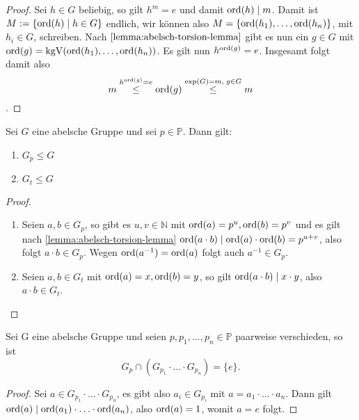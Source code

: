\begin{proof}
    Sei $h \in G$ beliebig, so gilt $h^m = e$ und damit $\operatorname{ord}(h) \mid m$. Damit ist $M := \{ \operatorname{ord}(h) \mid h \in G \}$ endlich, wir können also $M = \{ \operatorname{ord}(h_1), \hdots, \operatorname{ord}(h_n) \}$, mit $h_i \in G$, schreiben. Nach $\cref{lemma:abelsch-torsion-lemma}$ gibt es nun ein $g \in G$ mit $\operatorname{ord}(g) = \mathrm{kgV}(\operatorname{ord}(h_1), \hdots, \operatorname{ord}(h_n))$. Es gilt nun $h^{\operatorname{ord}(g)} = e$. Insgesamt folgt damit also $$m \overset{h^{\operatorname{ord}(g)} = e}{\leq} \operatorname{ord}(g) \overset{\exp(G) = m,\; g \in G}{\leq} m$$.
\end{proof}

\begin{lemma}
    Sei $G$ eine abelsche Gruppe und sei $p \in \mathbb{P}$. Dann gilt:
    \begin{enumerate}
        \item $G_p \leq G$
        \item $G_t \leq G$
    \end{enumerate}
\end{lemma}

\begin{proof}{\ }
    \begin{enumerate}
        \item Seien $a, b \in G_p$, so gibt es $u, v \in \mathbb{N}$ mit $\operatorname{ord}(a) = p^u, \operatorname{ord}(b) = p^v$ und es gilt nach \cref{lemma:abelsch-torsion-lemma} $\operatorname{ord}(a \cdot b) \mid \operatorname{ord}(a) \cdot \operatorname{ord}(b) = p^{u+v}$, also folgt $a \cdot b \in G_p$. Wegen $\operatorname{ord}(a^{-1}) = \operatorname{ord}(a)$ folgt auch $a^{-1} \in G_p$.
        \item Seien $a, b \in G_t$ mit $\operatorname{ord}(a) = x, \operatorname{ord}(b) = y$, so gilt $ \operatorname{ord}(a \cdot b) \mid x \cdot y$, also $a \cdot b \in G_t$.
    \end{enumerate}
\end{proof}

\begin{lemma} \label{lemma:p-anteile-verschieden}
    Sei G eine abelsche Gruppe und seien $p, p_1, \hdots, p_n \in \mathbb{P}$ paarweise verschieden, so ist
    $$ G_p \cap ( G_{p_1} \cdot \hdots \cdot G_{p_n} ) = \{ e \}. $$
\end{lemma}

\begin{proof}
    Sei $a \in G_{p_1} \cdot \hdots \cdot G_{p_n}$, es gibt also $a_i \in G_{p_i}$ mit $a = a_1 \cdot \hdots \cdot a_n$. Dann gilt $\operatorname{ord}(a) \mid \operatorname{ord}(a_1) \cdot \hdots \cdot \operatorname{ord}(a_n)$, also $\operatorname{ord}(a) = 1$, womit $a = e$ folgt.
\end{proof}

